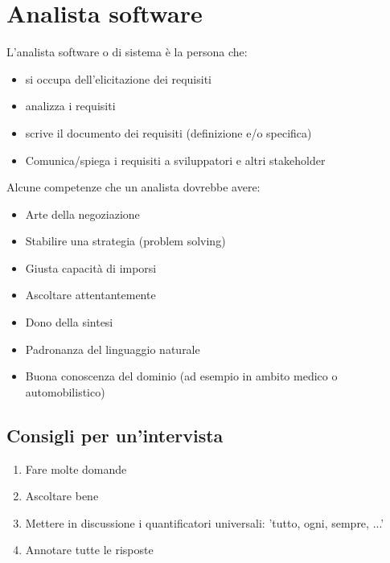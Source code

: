 \documentclass[12pt, a4paper]{report}
\begin{document}
\section{Analista software}
L'analista software o di sistema è la persona che:
\begin{itemize}
    \item si occupa dell'elicitazione dei requisiti
    \item analizza i requisiti
    \item scrive il documento dei requisiti (definizione e/o specifica)
    \item Comunica/spiega i requisiti a sviluppatori e altri stakeholder
\end{itemize}
Alcune competenze che un analista dovrebbe avere:
\begin{itemize}
    \item Arte della negoziazione
    \item Stabilire una strategia (problem solving)
    \item Giusta capacità di imporsi
    \item Ascoltare attentantemente
    \item Dono della sintesi
    \item Padronanza del linguaggio naturale
    \item Buona conoscenza del dominio (ad esempio in ambito medico o automobilistico)
\end{itemize}
\subsection{Consigli per un'intervista}
\begin{enumerate}
    \item Fare molte domande
    \item Ascoltare bene
    \item Mettere in discussione i quantificatori universali: 'tutto, ogni, sempre, ...'
    \item Annotare tutte le risposte
\end{enumerate}
\end{document}
